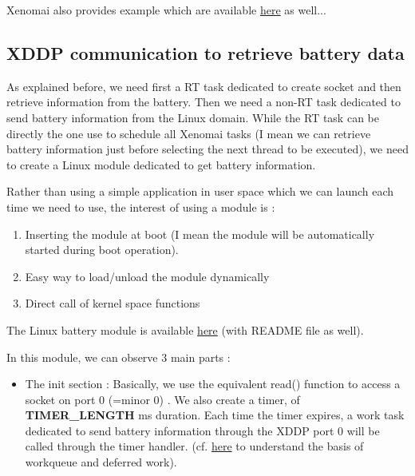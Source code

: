 \documentclass[12pt,hidelinks]{article}
\begin{document}
{ Xenomai also provides example which are available \href{https://Xenomai.org/documentation/Xenomai-3/html/xeno3prm/xddp-echo_8c-example.html}{here} as well...

	\subsection{XDDP communication to retrieve battery data}
    	
	As explained before, we need first a RT task dedicated to create socket and then retrieve information from the battery. Then we need a non-RT task dedicated to send battery information from the Linux domain. While the RT task can be directly the one use to schedule all Xenomai tasks (I mean we can retrieve battery information just before selecting the next thread to be executed), we need to create a Linux module dedicated to get battery information.
	
	Rather than using a simple application in user space which we can launch each time we need to use, the interest of using a module is :
	\begin{enumerate}
	    \item Inserting the module at boot (I mean the module will be automatically started during boot operation).
	    \item Easy way to load/unload the module dynamically
	    \item Direct call of kernel space functions
	\end{enumerate}
	
	The Linux battery module is available \href{https://github.com/skyultime/M2_ERTS_Project_Xenomai_edh/tree/dev/SourceCode/LinuxBattModule}{here} (with README file as well).\newline
	
	In this module, we can observe 3 main parts :
	\begin{itemize}
	    \item The init section : Basically, we use the equivalent read() function to access a socket on port 0 (=minor 0) . We also create a timer, of \textbf{TIMER\_LENGTH} ms duration. Each time the timer expires, a work task dedicated to send battery information through the XDDP port 0 will be called through the timer handler. (cf. \href{https://Linux-kernel-labs.github.io/refs/heads/master/labs/deferred_work.html}{here} to understand the basis of workqueue and deferred work).
	    

\end{itemize}}
\end{document}
